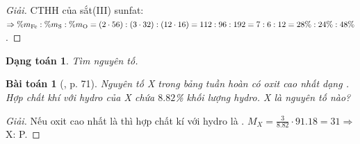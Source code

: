 \documentclass{article}
\newtheorem{baitoan}{Bài toán}
\newtheorem{dangtoan}{Dạng toán}
\begin{document}
\begin{proof}[Giải]
	CTHH của sắt(III) sunfat: $\Rightarrow\%m_{\ce{Fe}}:\%m_{\ce{S}}:\%m_{\ce{O}} = (2\cdot56):(3\cdot32):(12\cdot16) = 112:96:192 = 7:6:12 = 28\%:24\%:48\%$.
\end{proof}

\begin{dangtoan}
	Tìm nguyên tố.
\end{dangtoan}

\begin{baitoan}[\cite{Tuan2022}, p. 71]
	Nguyên tố X trong bảng tuần hoàn có oxit cao nhất dạng \emph{}. Hợp chất khí với hydro của X chứa $8.82$\% khối lượng hydro. X là nguyên tố nào?
\end{baitoan}

\begin{proof}[Giải]
	Nếu oxit cao nhất là  thì hợp chất kí với hydro là . $M_X = \frac{3}{8.82}\cdot91.18 = 31\Rightarrow$ X: P.
\end{proof}



\printbibliography[heading=bibintoc]
	
\end{document}
